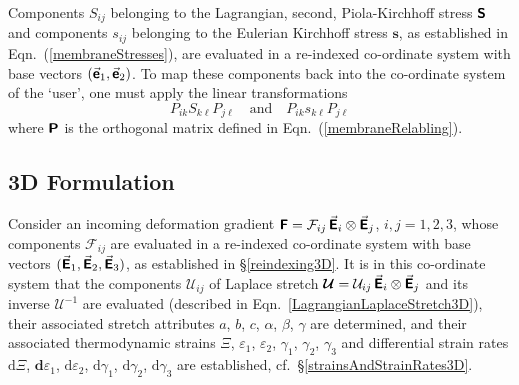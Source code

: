 Components $S_{ij}$ belonging to the Lagrangian, second, Piola-Kirchhoff stress $\boldsymbol{\mathsf{S}}$ and components $s_{ij}$ belonging to the Eulerian Kirchhoff stress $\boldsymbol{s}$, as established in Eqn.~(\ref{membraneStresses}), are evaluated in a re-indexed co-ordinate system with base vectors $( \vec{\boldsymbol{\mathsf{e}}}_1 , \vec{\boldsymbol{\mathsf{e}}}_2 )$.  To map these components back into the co-ordinate system of the `user', one must apply the linear transformations
\begin{displaymath}
    P_{ik} S_{k\ell} P_{j\ell}
    \quad \text{and} \quad
    P_{ik} s_{k\ell} P_{j\ell} 
\end{displaymath}
where $\boldsymbol{\mathsf{P}}$ is the orthogonal matrix defined in Eqn.~(\ref{membraneRelabling}).

\subsection{3D Formulation}

Consider an incoming deformation gradient $\boldsymbol{\mathsf{F}} = \mathcal{F}_{ij} \, \vec{\boldsymbol{\mathsf{E}}}_i \otimes \vec{\boldsymbol{\mathsf{E}}}_j$, $i, j = 1, 2, 3$, whose components $\mathcal{F}_{ij}$ are evaluated in a re-indexed co-ordinate system with base vectors $( \vec{\boldsymbol{\mathsf{E}}}_1 , \vec{\boldsymbol{\mathsf{E}}}_2 , \vec{\boldsymbol{\mathsf{E}}}_3 )$, as established in \S\ref{reindexing3D}.  It is in this co-ordinate system that the components $\mathcal{U}_{ij}$ of Laplace stretch $\boldsymbol{\mathcal{U}} = \mathcal{U}_{ij} \, \vec{\boldsymbol{\mathsf{E}}}_i \otimes \vec{\boldsymbol{\mathsf{E}}}_j$ and its inverse $\boldsymbol{\mathcal{U}}^{-1}$ are evaluated (described in Eqn.~\ref{LagrangianLaplaceStretch3D}), their associated stretch attributes $a$, $b$, $c$, $\alpha$, $\beta$, $\gamma$ are determined, and their associated thermo\-dynamic strains $\Xi$, $\varepsilon_1$, $\varepsilon_2$, $\gamma_1$, $\gamma_2$, $\gamma_3$ and differential strain rates $\mathrm{d} \Xi$, $\mathbf{d} \varepsilon_1$, $\mathrm{d} \varepsilon_2$, $\mathrm{d} \gamma_1$, $\mathrm{d} \gamma_2$, $\mathrm{d} \gamma_3$ are established, cf.\ \S\ref{strainsAndStrainRates3D}.

